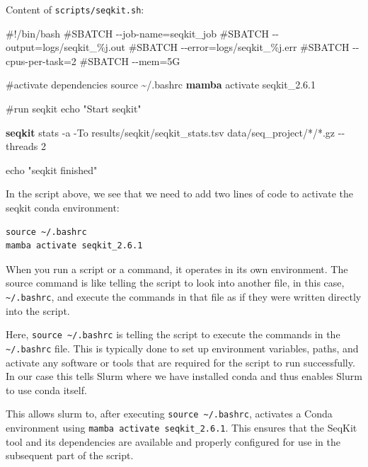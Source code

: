 \documentclass[
  letterpaper,
  DIV=11,
  numbers=noendperiod]{scrreprt}
\newenvironment{Shaded}{}{}
\newcommand{\AttributeTok}[1]{\textcolor[rgb]{0.84,0.23,0.29}{#1}}
\newcommand{\BuiltInTok}[1]{\textcolor[rgb]{0.84,0.23,0.29}{#1}}
\newcommand{\CommentTok}[1]{\textcolor[rgb]{0.42,0.45,0.49}{#1}}
\newcommand{\ExtensionTok}[1]{\textcolor[rgb]{0.84,0.23,0.29}{\textbf{#1}}}
\newcommand{\NormalTok}[1]{\textcolor[rgb]{0.14,0.16,0.18}{#1}}
\newcommand{\PreprocessorTok}[1]{\textcolor[rgb]{0.84,0.23,0.29}{#1}}
\newcommand{\StringTok}[1]{\textcolor[rgb]{0.01,0.18,0.38}{#1}}
\begin{document}
\begin{tcolorbox}
Content of \texttt{scripts/seqkit.sh}:

\begin{Shaded}
\begin{Highlighting}[]
\CommentTok{\#!/bin/bash}
\CommentTok{\#SBATCH {-}{-}job{-}name=seqkit\_job}
\CommentTok{\#SBATCH {-}{-}output=logs/seqkit\_\%j.out}
\CommentTok{\#SBATCH {-}{-}error=logs/seqkit\_\%j.err}
\CommentTok{\#SBATCH {-}{-}cpus{-}per{-}task=2}
\CommentTok{\#SBATCH {-}{-}mem=5G}

\CommentTok{\#activate dependencies}
\BuiltInTok{source}\NormalTok{ \textasciitilde{}/.bashrc}
\ExtensionTok{mamba}\NormalTok{ activate seqkit\_2.6.1}

\CommentTok{\#run seqkit}
\BuiltInTok{echo} \StringTok{"Start seqkit"}

\ExtensionTok{seqkit}\NormalTok{ stats }\AttributeTok{{-}a} \AttributeTok{{-}To}\NormalTok{ results/seqkit/seqkit\_stats.tsv data/seq\_project/}\PreprocessorTok{*}\NormalTok{/}\PreprocessorTok{*}\NormalTok{.gz }\AttributeTok{{-}{-}threads}\NormalTok{ 2}

\BuiltInTok{echo} \StringTok{"seqkit finished"}
\end{Highlighting}
\end{Shaded}

In the script above, we see that we need to add two lines of code to
activate the seqkit conda environment:

\begin{verbatim}
source ~/.bashrc
mamba activate seqkit_2.6.1
\end{verbatim}

When you run a script or a command, it operates in its own environment.
The source command is like telling the script to look into another file,
in this case, \texttt{\textasciitilde{}/.bashrc}, and execute the
commands in that file as if they were written directly into the script.

Here, \texttt{source\ \textasciitilde{}/.bashrc} is telling the script
to execute the commands in the \texttt{\textasciitilde{}/.bashrc} file.
This is typically done to set up environment variables, paths, and
activate any software or tools that are required for the script to run
successfully. In our case this tells Slurm where we have installed conda
and thus enables Slurm to use conda itself.

This allows slurm to, after executing
\texttt{source\ \textasciitilde{}/.bashrc}, activates a Conda
environment using \texttt{mamba\ activate\ seqkit\_2.6.1}. This ensures
that the SeqKit tool and its dependencies are available and properly
configured for use in the subsequent part of the script.

\end{tcolorbox}
\end{document}
